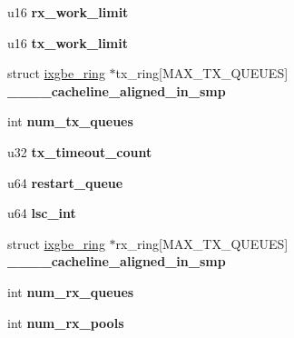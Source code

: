\begin{DoxyCompactItemize}
\item 
\hypertarget{structixgbe__adapter_ac8577d772ef82348214650d30c043669}{
u16 {\bfseries rx\_\-work\_\-limit}}
\label{structixgbe__adapter_ac8577d772ef82348214650d30c043669}

\item 
\hypertarget{structixgbe__adapter_a694726757aa79a9a0ee9f822b15b01b6}{
u16 {\bfseries tx\_\-work\_\-limit}}
\label{structixgbe__adapter_a694726757aa79a9a0ee9f822b15b01b6}

\item 
\hypertarget{structixgbe__adapter_a864bab09df2f8b05fce2729690f06593}{
struct \hyperlink{structixgbe__ring}{ixgbe\_\-ring} $\ast$tx\_\-ring\mbox{[}MAX\_\-TX\_\-QUEUES\mbox{]} {\bfseries \_\-\_\-\_\-\_\-cacheline\_\-aligned\_\-in\_\-smp}}
\label{structixgbe__adapter_a864bab09df2f8b05fce2729690f06593}

\item 
\hypertarget{structixgbe__adapter_a5d4c18f8fe8587e7986059cb82dfd6ba}{
int {\bfseries num\_\-tx\_\-queues}}
\label{structixgbe__adapter_a5d4c18f8fe8587e7986059cb82dfd6ba}

\item 
\hypertarget{structixgbe__adapter_ab840879f098d4f2ff636393df23c45b1}{
u32 {\bfseries tx\_\-timeout\_\-count}}
\label{structixgbe__adapter_ab840879f098d4f2ff636393df23c45b1}

\item 
\hypertarget{structixgbe__adapter_a5e95f2c9905b91273cbdf65bf60d75fd}{
u64 {\bfseries restart\_\-queue}}
\label{structixgbe__adapter_a5e95f2c9905b91273cbdf65bf60d75fd}

\item 
\hypertarget{structixgbe__adapter_a08a58ba0c6157e0b2a962399fd37b571}{
u64 {\bfseries lsc\_\-int}}
\label{structixgbe__adapter_a08a58ba0c6157e0b2a962399fd37b571}

\item 
\hypertarget{structixgbe__adapter_a376efdae8a96f1bd93d4a36d7b8c2866}{
struct \hyperlink{structixgbe__ring}{ixgbe\_\-ring} $\ast$rx\_\-ring\mbox{[}MAX\_\-TX\_\-QUEUES\mbox{]} {\bfseries \_\-\_\-\_\-\_\-cacheline\_\-aligned\_\-in\_\-smp}}
\label{structixgbe__adapter_a376efdae8a96f1bd93d4a36d7b8c2866}

\item 
\hypertarget{structixgbe__adapter_a86b91e76d7ea791fae2ee4a80307d166}{
int {\bfseries num\_\-rx\_\-queues}}
\label{structixgbe__adapter_a86b91e76d7ea791fae2ee4a80307d166}

\item 
\hypertarget{structixgbe__adapter_a61bd959ff1e708c8053f76dd5534781a}{
int {\bfseries num\_\-rx\_\-pools}}
\label{structixgbe__adapter_a61bd959ff1e708c8053f76dd5534781a}


\end{DoxyCompactItemize}
